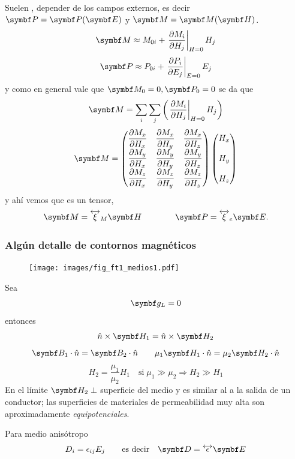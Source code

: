 \documentclass[10pt,oneside]{CBFT_book}
\begin{document}
Suelen , depender de los campos externos, es decir $\vb{P}=\vb{P}(\vb{E})$ y 
$\vb{M}=\vb{M}(\vb{H})$.
\[
	\vb{M} \approx M_{0i} + \left.\dpar{M_i}{H_j}\right|_{H=0} H_j
\]
\[
	\vb{P} \approx P_{0i} + \left.\dpar{P_i}{E_j}\right|_{E=0} E_j
\]
y como en general vale que $\vb{M}_0=0, \vb{P}_0=0$  se da que 
\[
	\vb{M} = \sum_i \sum_j \left( \left.\dpar{M_i}{H_j}\right|_{H=0} H_j \right) 
\]
\[
	\vb{M} = 
	\begin{pmatrix}
	 \displaystyle{\dpar{M_x}{H_x}} & \displaystyle{\dpar{M_x}{H_y}} & \displaystyle{\dpar{M_x}{H_z}} \\
	 \displaystyle{\dpar{M_y}{H_x}} & \displaystyle{\dpar{M_y}{H_y}} & \displaystyle{\dpar{M_y}{H_z}} \\
	 \displaystyle{\dpar{M_z}{H_x}} & \displaystyle{\dpar{M_z}{H_y}} & \displaystyle{\dpar{M_z}{H_z}}
	\end{pmatrix}
	\begin{pmatrix}
	 \displaystyle{H_x} \\
	 \\
	 H_y \\
	 \\
	 H_z
	\end{pmatrix}
\]
y ahí vemos que es un tensor,
\[
	\vb{M} = \overleftrightarrow{\xi}_M \vb{H} \qquad\qquad \vb{P} =  \overleftrightarrow{\xi}_e \vb{E}.
\]

\subsubsection{Algún detalle de contornos magnéticos}

\begin{figure}[htb]
	\begin{center}
	\texttt{[image: images/fig\_ft1\_medios1.pdf]}	 
	\end{center}
	\caption{}
\end{figure}
Sea
\[
	\vb{g}_L = 0 
\]
entonces
\[
	\hat{n}\times\vb{H}_1 = \hat{n}\times\vb{H}_2
\]
\[
	\vb{B}_1\cdot\hat{n} = \vb{B}_2\cdot\hat{n} \qquad
		\mu_1\vb{H}_1\cdot\hat{n} = \mu_2\vb{H}_2\cdot\hat{n}
\]
\[
	H_2 = \frac{\mu_1}{\mu_2} H_1 \quad \text{si} \; \mu_1 \gg \mu_2 \Rightarrow H_2 \gg H_1
\]
En el límite $\vb{H}_2 \perp$ superficie del medio y es similar al  a la salida de un
conductor; las superficies de materiales de permeabilidad muy alta son aproximadamente {\it equipotenciales}.

Para medio anisótropo
\[
	D_i = \epsilon_{ij} E_j \qquad \text{es decir} \quad \vb{D} = \overleftrightarrow{\epsilon} \vb{E}
\]
\end{document}
